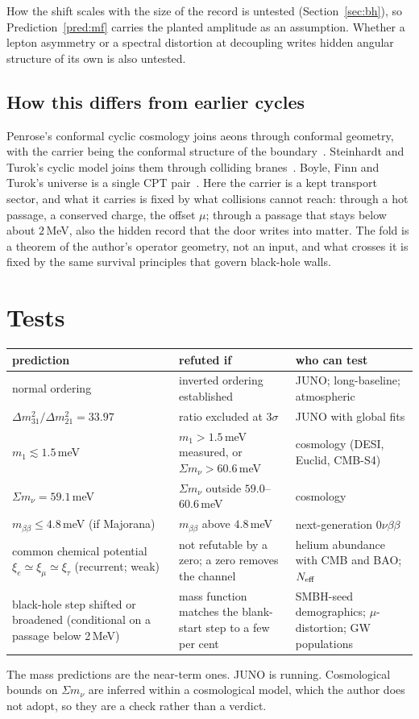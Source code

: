 \documentclass[11pt]{article}
\theoremstyle{definition}\newtheorem{hypothesis}{Hypothesis}\newtheorem{prediction}{Prediction}
\theoremstyle{remark}\newtheorem{remark}[theorem]{Remark}
\begin{document}
How the shift scales with the size of the record is untested (Section~\ref{sec:bh}), so Prediction~\ref{pred:mf} carries the planted amplitude as an assumption. Whether a lepton asymmetry or a spectral distortion at decoupling writes hidden angular structure of its own is also untested.

\subsection{How this differs from earlier cycles}
Penrose's conformal cyclic cosmology joins aeons through conformal geometry, with the carrier being the conformal structure of the boundary~\cite{CCC}. Steinhardt and Turok's cyclic model joins them through colliding branes~\cite{ST}. Boyle, Finn and Turok's universe is a single CPT pair~\cite{BFT}. Here the carrier is a kept transport sector, and what it carries is fixed by what collisions cannot reach: through a hot passage, a conserved charge, the offset $\mu$; through a passage that stays below about $2$\,MeV, also the hidden record that the door writes into matter. The fold is a theorem of the author's operator geometry, not an input, and what crosses it is fixed by the same survival principles that govern black-hole walls.

\section{Tests}\label{sec:tests}
\begin{center}\small\begin{tabular}{p{}p{}p{}}\toprule
prediction & refuted if & who can test\\\midrule
normal ordering & inverted ordering established & JUNO; long-baseline; atmospheric\\
$\Delta m^2_{31}/\Delta m^2_{21}=33.97$ & ratio excluded at $3\sigma$ & JUNO with global fits\\
$m_1\lesssim1.5$\,meV & $m_1>1.5$\,meV measured, or $\Sigma m_\nu>60.6$\,meV & cosmology (DESI, Euclid, CMB-S4)\\
$\Sigma m_\nu=59.1$\,meV & $\Sigma m_\nu$ outside $59.0$--$60.6$\,meV & cosmology\\
$m_{\beta\beta}\le4.8$\,meV (if Majorana) & $m_{\beta\beta}$ above $4.8$\,meV & next-generation $0\nu\beta\beta$\\
common chemical potential $\xi_e\simeq\xi_\mu\simeq\xi_\tau$ (recurrent; weak) & not refutable by a zero; a zero removes the channel & helium abundance with CMB and BAO; $N_{\rm eff}$\\
black-hole step shifted or broadened (conditional on a passage below 2\,MeV) & mass function matches the blank-start step to a few per cent & SMBH-seed demographics; $\mu$-distortion; GW populations\\\bottomrule\end{tabular}\end{center}
The mass predictions are the near-term ones. JUNO is running. Cosmological bounds on $\Sigma m_\nu$ are inferred within a cosmological model, which the author does not adopt, so they are a check rather than a verdict.
\end{document}
